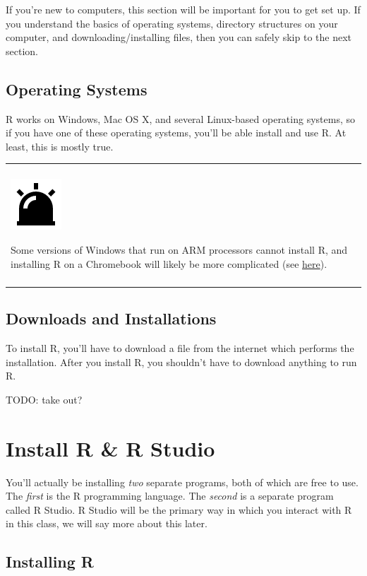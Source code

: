 \documentclass[
]{book}
\newenvironment{caution}
{
  \begin{center}
  \begin{tabular}{|>{\columncolor{caution}}p{0.9\textwidth}|}
  \hline\\
  \includegraphics[scale=0.1]{src/images/alarm-warning-fill.png}
}
{\\\\\hline
  \end{tabular}
  \end{center}
}
\begin{document}
If you're new to computers, this section will be important for you to get set up.
If you understand the basics of operating systems, directory structures on your computer, and downloading/installing files, then you can safely skip to the next section.

\hypertarget{operating-systems}{%
\subsection{Operating Systems}\label{operating-systems}}

R works on Windows, Mac OS X, and several Linux-based operating systems, so if you have one of these operating systems, you'll be able install and use R.
At least, this is mostly true.

\begin{caution}
Some versions of Windows that run on ARM processors cannot install R,
and installing R on a Chromebook will likely be more complicated (see
\href{https://francish.netlify.app/post/installing-r-and-rstudio-on-a-pixel-slate/}{here}).
\end{caution}

\hypertarget{downloads-and-installations}{%
\subsection{Downloads and Installations}\label{downloads-and-installations}}

To install R, you'll have to download a file from the internet which performs the installation.
After you install R, you shouldn't have to download anything to run R.

TODO: take out?

\hypertarget{install-r-r-studio}{%
\section{Install R \& R Studio}\label{install-r-r-studio}}

You'll actually be installing \emph{two} separate programs, both of which are free to use.
The \emph{first} is the R programming language.
The \emph{second} is a separate program called R Studio.
R Studio will be the primary way in which you interact with R in this class, we will say more about this later.

\hypertarget{installing-r}{%
\subsection{Installing R}\label{installing-r}}
\end{document}
